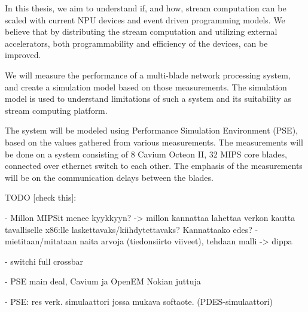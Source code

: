 In this thesis, we aim to understand if, and how, stream computation can be scaled with current NPU devices and event driven programming models. We believe that by distributing the stream computation and utilizing external accelerators, both programmability and efficiency of the devices, can be improved.

We will measure the performance of a multi-blade network processing system, and create a simulation model based on those measurements. The simulation model is used to understand limitations of such a system and its suitability as stream computing platform.

The system will be modeled using Performance Simulation Environment (PSE), based on the values gathered from various measurements. The measurements will be done on a system consisting of 8 Cavium Octeon II, 32 MIPS core blades, connected over ethernet switch to each other. The emphasis of the measurements will be on the communication delays between the blades.


TODO [check this]:


- Millon MIPSit menee kyykkyyn?
  -> millon kannattaa lahettaa verkon kautta tavalliselle x86:lle laskettavaks/kiihdytettavaks? Kannattaako edes?
  -  mietitaan/mitataan naita arvoja (tiedonsiirto viiveet), tehdaan malli -> dippa

- switchi full crossbar

- PSE main deal, Cavium ja OpenEM Nokian juttuja

- PSE: res verk. simulaattori jossa mukava softaote. (PDES-simulaattori)


